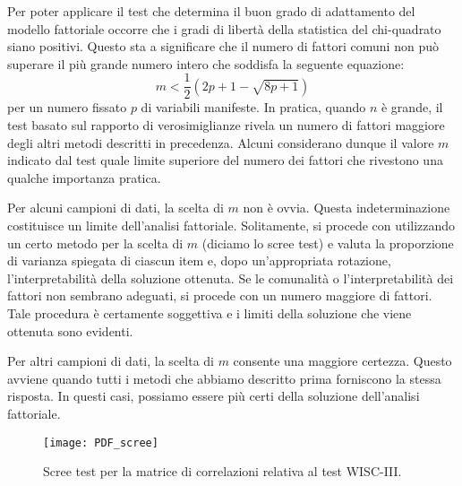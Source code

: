  Per poter applicare il test che  determina il buon grado di adattamento del modello fattoriale occorre che i gradi di libertà della statistica del chi-quadrato 
 siano positivi.
   Questo sta a significare che il numero di fattori comuni non può superare il più  
 grande numero intero che soddisfa la seguente equazione: 
 \begin{equation}
 m < \frac{1}{2} \left( 2p+1-\sqrt{8p+1} \right)
 \end{equation}
 per un numero fissato $p$ di variabili manifeste.
  In pratica, quando $n$ è grande, il test basato sul rapporto di verosimiglianze rivela un numero di fattori maggiore degli altri metodi descritti in precedenza.
 Alcuni considerano dunque il valore $m$ indicato dal test quale limite superiore del numero dei fattori che rivestono una qualche importanza pratica.
  
 Per alcuni campioni di dati, la scelta di $m$ non è ovvia.
 Questa indeterminazione costituisce un limite dell'analisi fattoriale.
 Solitamente, si procede con utilizzando un certo metodo per la scelta di $m$ (diciamo lo scree test) e valuta la proporzione di varianza spiegata di ciascun item e, dopo un'appropriata rotazione, l'interpretabilità della soluzione ottenuta.
 Se le comunalità o l'interpretabilità dei fattori non sembrano adeguati, si procede con un numero maggiore di fattori. 
 Tale procedura è certamente soggettiva e i limiti della soluzione che viene ottenuta sono evidenti.

Per altri campioni di dati, la scelta di $m$  consente una maggiore certezza.
Questo avviene quando tutti i metodi che abbiamo descritto prima forniscono la stessa risposta.
In questi casi, possiamo essere più certi della soluzione dell'analisi fattoriale.

\begin{figure}[ht!]
\centering
    \texttt{[image: PDF\_scree]}
    \caption{Scree test per la matrice di correlazioni relativa al test WISC-III.}
  \label{fig:scree}
\end{figure}

